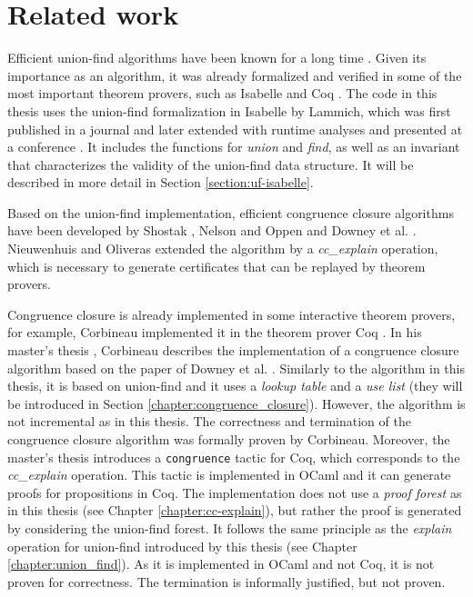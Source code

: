 \section{Related work}

Efficient union-find algorithms have been known for a long time \cite{unionfind-og, Tarjan}. Given its importance as an algorithm, it was already formalized and verified in some of the most important theorem provers, such as Isabelle and Coq \cite{unionfind-persistent}. The code in this thesis uses the union-find formalization in Isabelle by Lammich, which was first published in a journal \cite{unionfind-isabelle} and later extended with runtime analyses and presented at a conference \cite{unionfind-isabelle-conference}. It includes the functions for \emph{union} and \emph{find}, as well as an invariant that characterizes the validity of the union-find data structure. It will be described in more detail in Section \ref{section:uf-isabelle}.

Based on the union-find implementation, efficient congruence closure algorithms have been developed by Shostak \cite{congruenceclosure-og2}, Nelson and Oppen \cite{congruenceclosure-og} and Downey et al. \cite{congruenceclosure-og3}.
Nieuwenhuis and Oliveras \cite{Nieuwenhuis} extended the algorithm by a \emph{cc\_explain} operation, which is necessary to generate certificates that can be replayed by theorem provers.

Congruence closure is already implemented in some interactive theorem provers, for example,  Corbineau implemented it in the theorem prover Coq \cite{congruence-coq}.
In his master's thesis \cite{congruenceclosure-coq}, Corbineau describes the implementation of a congruence closure algorithm based on the paper of Downey et al. \cite{congruenceclosure-og3}.
Similarly to the algorithm in this thesis, it is based on union-find and it uses a \emph{lookup table} and a \emph{use list} (they will be introduced in Section \ref{chapter:congruence_closure}). However, the algorithm is not incremental as in this thesis.
The correctness and termination of the congruence closure algorithm was formally proven by Corbineau.
Moreover, the master's thesis introduces a \lstinline|congruence| tactic for Coq, which corresponds to the \emph{cc\_explain} operation.
This tactic is implemented in OCaml and it can generate proofs for propositions in Coq.
The implementation does not use a \emph{proof forest} as in this thesis (see Chapter \ref{chapter:cc-explain}), but rather the proof is generated by considering the union-find forest.
It follows the same principle as the \emph{explain} operation for union-find introduced by this thesis (see Chapter \ref{chapter:union_find}).
As it is implemented in OCaml and not Coq, it is not proven for correctness. The termination is informally justified, but not proven.

